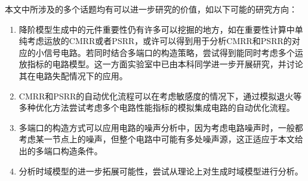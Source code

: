本文中所涉及的多个话题均有可以进一步研究的价值，如以下可能的研究方向：

\begin{enumerate}[label=\emph{\alph*})]
	\item 降阶模型生成中的元件重要性仍有许多可以挖掘的地方，如在重要性计算中单纯考虑运放的CMRR或者PSRR，或许可以得到用于分析CMRR和PSRR的对应的小信号电路。若同时结合多端口的构造策略，尝试得到能同时考虑多个运放指标的电路模型。这一方面实验室中已由本科同学进一步开展研究，并讨论其在电路失配情况下的应用。
	\item CMRR和PSRR的自动优化流程可以在考虑敏感度的情况下，通过模拟退火等多种优化方法尝试考虑多个电路性能指标的模拟集成电路的自动优化流程。
	\item 多端口的构造方式可以应用电路的噪声分析中，因为考虑电路噪声时，一般都考虑某一节点上的噪声，但整个电路中可能有多处噪声源，这正适应于本文给出的多端口构造条件。
	\item 分析时域模型的进一步拓展可能性，尝试从理论上对生成时域模型进行分析。
\end{enumerate}